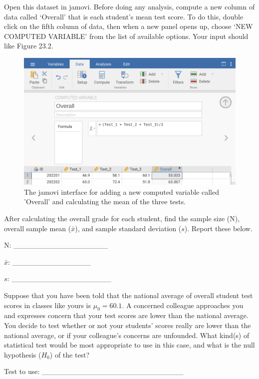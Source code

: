 \documentclass[
]{scrbook}
\begin{document}
Open this dataset in jamovi.
Before doing any analysis, compute a new column of data called `Overall' that is each student's mean test score.
To do this, double click on the fifth column of data, then when a new panel opens up, choose `NEW COMPUTED VARIABLE' from the list of available options.
Your input should like Figure 23.2.

\begin{figure}
\includegraphics[width=1\linewidth]{img/jamovi_students_overall} \caption{The jamovi interface for adding a new computed variable called 'Overall' and calculating the mean of the three tests.}\label{fig:unnamed-chunk-101}
\end{figure}

After calculating the overall grade for each student, find the sample size (N), overall sample mean (\(\bar{x}\)), and sample standard deviation (\(s\)).
Report these below.

N: \_\_\_\_\_\_\_\_\_\_\_\_\_\_\_\_\_\_

\(\bar{x}\): \_\_\_\_\_\_\_\_\_\_\_\_\_\_\_

\(s\): \_\_\_\_\_\_\_\_\_\_\_\_\_\_\_\_\_\_\_

Suppose that you have been told that the national average of overall student test scores in classes like yours is \(\mu_{0} = 60.1\).
A concerned colleague approaches you and expresses concern that your test scores are lower than the national average.
You decide to test whether or not your students' scores really are lower than the national average, or if your colleague's concerns are unfounded.
What kind(s) of statistical test would be most appropriate to use in this case, and what is the null hypothesis (\(H_{0}\)) of the test?

Test to use: \_\_\_\_\_\_\_\_\_\_\_\_\_\_\_\_\_\_\_\_\_\_\_\_\_\_\_
\end{document}
